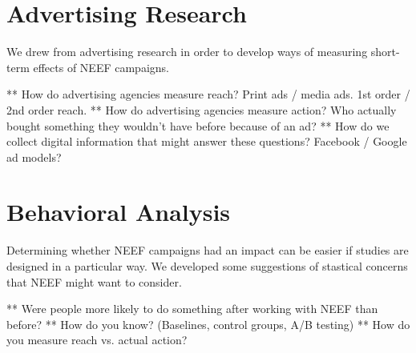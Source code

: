 \documentclass{article}
\begin{document}
\section{Advertising Research}
We drew from advertising research in order to develop ways of measuring
short-term effects of NEEF campaigns.

** How do advertising agencies measure reach?  Print ads / media ads.  1st order / 2nd order reach.
** How do advertising agencies measure action?  Who actually bought something they wouldn't have before because of an ad?
** How do we collect digital information that might answer these questions?  Facebook / Google ad models?

\section{Behavioral Analysis}
Determining whether NEEF campaigns had an impact
can be easier if studies are designed in a particular way.
We developed some suggestions of stastical concerns that
NEEF might want to consider.

** Were people more likely to do something after working with NEEF than before?
** How do you know?  (Baselines, control groups, A/B testing)
** How do you measure reach vs. actual action?
\end{document}
